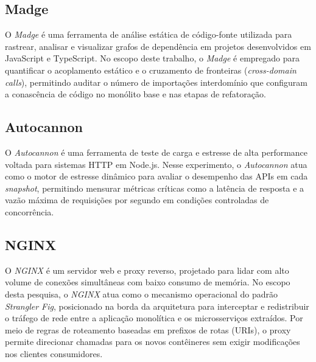 \subsection*{Madge}
O \textit{Madge} é uma ferramenta de análise estática de código-fonte utilizada para rastrear, analisar e visualizar grafos de dependência em projetos desenvolvidos em JavaScript e TypeScript. No escopo deste trabalho, o \textit{Madge} é empregado para quantificar o acoplamento estático e o cruzamento de fronteiras (\textit{cross-domain calls}), permitindo auditar o número de importações interdomínio que configuram a conascência de código no monólito base e nas etapas de refatoração.

\subsection*{Autocannon}
O \textit{Autocannon} é uma ferramenta de teste de carga e estresse de alta performance voltada para sistemas HTTP em Node.js. Nesse experimento, o \textit{Autocannon} atua como o motor de estresse dinâmico para avaliar o desempenho das APIs em cada \textit{snapshot}, permitindo mensurar métricas críticas como a latência de resposta e a vazão máxima de requisições por segundo em condições controladas de concorrência.

\subsection*{NGINX}
O \textit{NGINX} é um servidor web e proxy reverso, projetado para lidar com alto volume de conexões simultâneas com baixo consumo de memória. No escopo desta pesquisa, o \textit{NGINX} atua como o mecanismo operacional do padrão \textit{Strangler Fig}, posicionado na borda da arquitetura para interceptar e redistribuir o tráfego de rede entre a aplicação monolítica e os microsserviços extraídos. Por meio de regras de roteamento baseadas em prefixos de rotas (URIs), o proxy permite direcionar chamadas para os novos contêineres sem exigir modificações nos clientes consumidores.

